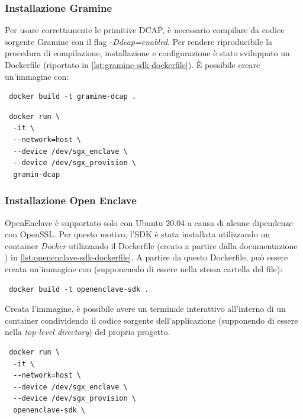 \documentclass{article}
\begin{document}
\subsubsection{Installazione Gramine}
Per usare correttamente le primitive DCAP, è necessario compilare da codice sorgente Gramine con il flag \textit{-Ddcap=enabled}. Per rendere riproducibile la procedura di compilazione, installazione e configurazione è stato sviluppato un Dockerfile (riportato in \cref{lst:gramine-sdk-dockerfile}). È possibile creare un'immagine con:
\begin{verbatim}
 docker build -t gramine-dcap . 
\end{verbatim}


\begin{verbatim}
 docker run \
  -it \
  --network=host \
  --device /dev/sgx_enclave \ 
  --device /dev/sgx_provision \
  gramin-dcap
\end{verbatim}

\subsubsection{Installazione Open Enclave} OpenEnclave è supportato solo con Ubuntu 20.04 a causa di alcune dipendenze con OpenSSL. Per questo motivo, l'SDK è stata installata utilizzando un container \textit{Docker} utilizzando il Dockerfile (creato a partire dalla documentazione \cite{openenclave}) in \cref{lst:openenclave-sdk-dockerfile}. A partire da questo Dockerfile, può essere creata un'immagine con (supponenedo di essere nella stessa cartella del file):
\begin{verbatim}
 docker build -t openenclave-sdk .
\end{verbatim}



Creata l'immagine, è possibile avere un terminale interattivo all'interno di un container condividendo il codice sorgente dell'applicazione (supponendo di essere nella \textit{top-level directory}) del proprio progetto. 
\begin{verbatim}
 docker run \
  -it \
  --network=host \
  --device /dev/sgx_enclave \ 
  --device /dev/sgx_provision \
  openenclave-sdk \ 
\end{verbatim}
\end{document}
